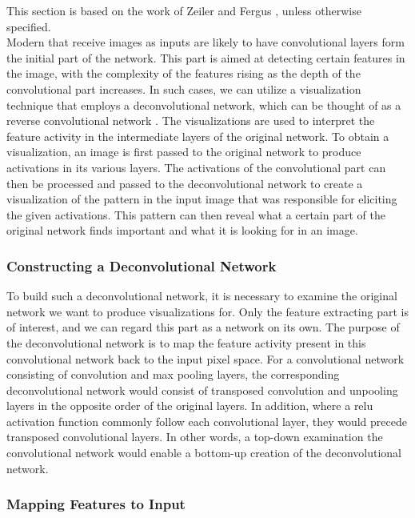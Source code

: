 This section is based on the work of Zeiler and Fergus \cite{deconv-vis-article}, unless otherwise specified. \\

\noindent Modern  that receive images as inputs are likely to have convolutional layers form the initial part of the network. This part is aimed at detecting certain features in the image, with the complexity of the features rising as the depth of the convolutional part increases. In such cases, we can utilize a visualization technique that employs a deconvolutional network, which can be thought of as a reverse convolutional network \cite{deconv-net-article}. The visualizations are used to interpret the feature activity in the intermediate layers of the original network. To obtain a visualization, an image is first passed to the original network to produce activations in its various layers. The activations of the convolutional part can then be processed and passed to the deconvolutional network to create a visualization of the pattern in the input image that was responsible for eliciting the given activations. This pattern can then reveal what a certain part of the original network finds important and what it is looking for in an image.

\subsubsection{Constructing a Deconvolutional Network}

To build such a deconvolutional network, it is necessary to examine the original network we want to produce visualizations for. Only the feature extracting part is of interest, and we can regard this part as a network on its own. The purpose of the deconvolutional network is to map the feature activity present in this convolutional network back to the input pixel space. For a convolutional network consisting of convolution and max pooling layers, the corresponding deconvolutional network would consist of transposed convolution and unpooling layers in the opposite order of the original layers. In addition, where a \acrshort{relu} activation function commonly follow each convolutional layer, they would precede transposed convolutional layers. In other words, a top-down examination the convolutional network would enable a bottom-up creation of the deconvolutional network. 

\subsubsection{Mapping Features to Input}

